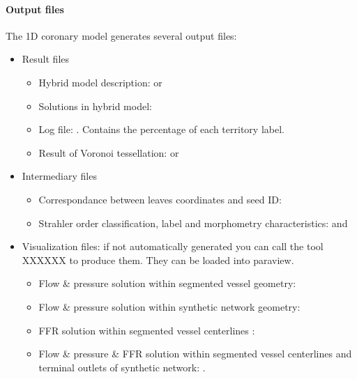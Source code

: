 \documentclass[a4paper, 11pt]{article} %
\begin{document}
\paragraph*{Output files}
The 1D coronary model generates several output files:
\begin{itemize}
\item Result files
\begin{itemize}
\item Hybrid model description:  or  
\item Solutions in hybrid model: 
\item Log file: . Contains the percentage of each territory label.
\item Result of Voronoi tessellation:  or 
\end{itemize}

\item Intermediary files
\begin{itemize}
\item Correspondance between leaves coordinates and seed ID: 
\item Strahler order classification, label and morphometry characteristics:  and 

\end{itemize}
\item Visualization files: if not automatically generated you can call the tool XXXXXX to produce them. 
They can be loaded into paraview.
\begin{itemize}
\item Flow \& pressure solution within segmented vessel geometry: 
\item Flow \& pressure solution within synthetic network geometry: 
\item FFR solution within segmented vessel centerlines : 
\item Flow \& pressure \& FFR solution within segmented vessel centerlines and terminal outlets of synthetic network:  .

\end{itemize}

\end{itemize}
\end{document}
